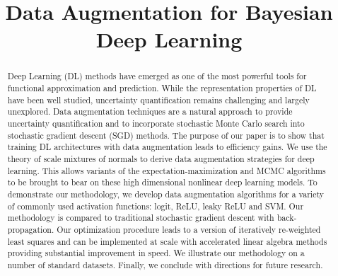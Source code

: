 \documentclass[ba]{imsart}
\numberwithin{equation}{section}
\theoremstyle{plain}
\begin{document}
\begin{frontmatter}
\title{Data Augmentation for  Bayesian  Deep Learning}




\begin{abstract}
\noindent  Deep Learning (DL)  methods have emerged as one of the most powerful tools for  functional approximation and prediction.  While the representation properties of DL have been well studied, uncertainty quantification remains challenging and largely unexplored. Data augmentation techniques are a natural approach to provide uncertainty  quantification and to incorporate  stochastic Monte Carlo search into stochastic gradient descent (SGD) methods. The purpose of our paper is to show that training DL architectures with data augmentation leads to efficiency gains. We use the theory of scale mixtures of normals to derive data augmentation strategies for deep learning. This allows variants of the expectation-maximization and MCMC algorithms to be brought to bear on these high dimensional nonlinear deep learning models. To demonstrate our methodology, we develop  data augmentation algorithms  for a variety of commonly used activation functions: logit, ReLU, leaky ReLU and SVM. Our methodology is compared to traditional stochastic gradient descent with  back-propagation. Our optimization procedure leads to a version of iteratively re-weighted least squares and can be implemented at scale with accelerated linear algebra methods  providing substantial improvement in speed. We illustrate our methodology on a number of standard datasets.  Finally, we conclude with directions for future research.
\end{abstract}

\begin{keyword}
\end{keyword}

\end{frontmatter}
\end{document}
